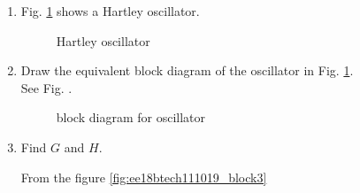 \begin{enumerate}[label=\thesubsection.\arabic*.,ref=\thesubsection.\theenumi]

\item Fig. \ref{fig:ee18btech111019_hart} shows a Hartley oscillator.

\begin{figure}[ht]
    \begin{center}
	    \resizebox{\columnwidth}{!}{}
	\end{center}
\caption{Hartley oscillator}
\label{fig:ee18btech111019_hart}
\end{figure}
\item Draw the equivalent block diagram of the  oscillator in Fig. \ref{fig:ee18btech111019_hart}.\\
\solution See Fig. \label{fig:ee18btech111019_hart_block}. 
%
\begin{figure}[!ht]
    \begin{center}
		
		\resizebox{\columnwidth}{!}{} %
	\end{center}
\caption{block diagram for oscillator}
\label{fig:ee18btech111019_hart_block}
\end{figure}

\item Find $G$ and $H$.

\solution From the figure \ref{fig:ee18btech111019_block3}\\

\begin{figure}[!ht]
    \begin{center}
		\resizebox{\columnwidth}{!}{}
		

\end{center}
\end{figure}
\end{enumerate}
